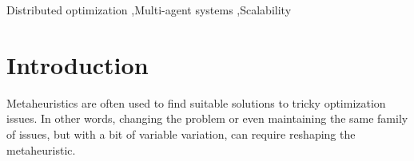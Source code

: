 \documentclass[preprint,12pt]{elsarticle}
\begin{document}
\begin{frontmatter}
\begin{abstract}
\begin{comment}
This was compiled through chatGpt

This work describes the results of a scalability experiment conducted on a simulation system using various metaheuristic configurations. The investigation was conducted in four executions with 18 agents and different designs. The latency for the four main messages exchanged was recorded, and the results were analyzed using statistical methods. The ANOVA and Tukey-HSD tests were applied to the UpdateGlobalSummary message, while the Kruskal-Wallis and Conover-Iman tests were used for the UpdateRegionSummary and RegionSplit messages. The results indicate that the number of nodes in the simulation cluster affects the system's performance, and some configurations show better performance than others. The experiment's findings could be helpful for researchers and practitioners in simulation systems and metaheuristics.


esta parte do GPT, por exemplo, não está legal\\


The ANOVA and Tukey-HSD tests were applied to the UpdateGlobalSummary message, while the Kruskal-Wallis and Conover-Iman tests were used for the UpdateRegionSummary and RegionSplit messages.

\end{comment}
\end{abstract}



\begin{keyword}
Distributed optimization \sep Multi-agent systems \sep Scalability
\end{keyword}

\end{frontmatter}


\section{Introduction}

Metaheuristics are often used to find suitable solutions to tricky optimization issues. In other words, changing the problem or even maintaining the same family of issues, but with a bit of variable variation, can require reshaping the metaheuristic.
\end{document}
